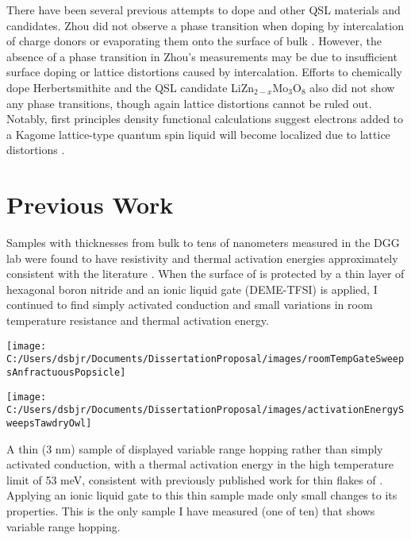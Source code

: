 \documentclass[11pt]{article}
\newenvironment{Figure}
  {\par\medskip\noindent\minipage{\linewidth}}
  {\endminipage\par\medskip}
\begin{document}
\begin{multicols}{2}
There have been several previous attempts to dope \rucl and other QSL materials and candidates. Zhou did not observe a phase transition when doping \rucl by intercalation of charge donors or evaporating them onto the surface of bulk \rucl \cite{Zhou2016}. However, the absence of a phase transition in Zhou's measurements may be due to insufficient surface doping or lattice distortions caused by intercalation. Efforts to chemically dope Herbertsmithite \cite{Kelly2016} and the QSL candidate LiZn$_{2-x}$Mo$_{3}$O$_{8}$ \cite{Sheckelton2015} also did not show any phase transitions, though again lattice distortions cannot be ruled out. Notably, first principles density functional calculations suggest electrons added to a Kagome lattice-type quantum spin liquid will become localized due to lattice distortions \cite{Liu2018}.

\section{Previous Work}

Samples with thicknesses from bulk to tens of nanometers measured in the DGG lab were found to have resistivity and thermal activation energies approximately consistent with the literature \cite{Rojas1983}. When the surface of \rucl is protected by a thin layer of hexagonal boron nitride and an ionic liquid gate (DEME-TFSI) is applied, I continued to find simply activated conduction and small variations in room temperature resistance and thermal activation energy.

\begin{Figure}
\centering
  {\texttt{[image: C:/Users/dsbjr/Documents/DissertationProposal/images/roomTempGateSweepsAnfractuousPopsicle]}\label{fig:f1}}
\end{Figure}

\begin{Figure}  
  {\texttt{[image: C:/Users/dsbjr/Documents/DissertationProposal/images/activationEnergySweepsTawdryOwl]}\label{fig:f2}}
\end{Figure}

A thin (3 nm) sample of \rucl displayed variable range hopping rather than simply activated conduction, with a thermal activation energy in the high temperature limit of 53 meV, consistent with previously published work for thin flakes of \rucl \cite{Mashhadi2018}. Applying an ionic liquid gate to this thin sample made only small changes to its properties. This is the only sample I have measured (one of ten) that shows variable range hopping.


\end{multicols}
\end{document}
